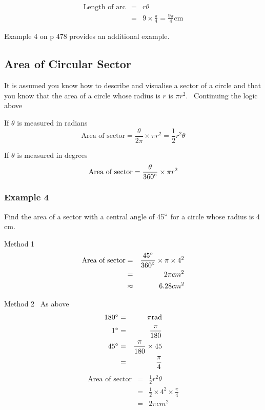 \begin{align*}\text{Length of arc} &  = & r \theta  \\
 &  = & 9 \times \frac{\pi }{4} =\frac{9 \pi }{4}\text{}\mbox{cm}\end{align*}

Example 4 on p 478 provides an additional example. 

\subsection{Area of Circular Sector}
It is assumed you know how to describe and visualise a sector of a circle and that you know that the area of a circle whose radius is $r$ is $\pi  r^{2}$. \ Continuing the logic above 

If $\theta $ is measured in radians
\begin{equation*}\text{Area of sector} =\frac{\theta }{2 \pi } \times \pi  r^{2} =\frac{1}{2} r^{2} \theta 
\end{equation*}

If $\theta $ is measured in degrees
\begin{equation*}\text{Area of sector} =\frac{\theta }{360 \mbox{{\ensuremath{{}^\circ}}}} \times \pi  r^{2}
\end{equation*}

\subsubsection{Example 4}
Find the area of a sector with a central angle of 45$\mbox{{\ensuremath{{}^\circ}}}$ for a circle whose radius is 4 $\mbox{cm}$. 

Method 1
\begin{align*}\text{Area of sector} &  = & \frac{45 \mbox{{\ensuremath{{}^\circ}}}}{360 \mbox{{\ensuremath{{}^\circ}}}} \times \pi  \times 4^{2} \\
 &  = & 2 \pi \text{}cm^{2} \\
 &  \approx  & 6.28\text{}cm^{2}\end{align*}

Method 2 \ As above
\begin{align*}180 \mbox{{\ensuremath{{}^\circ}}} &  = & \pi \text{}\mbox{rad} \\
1 \mbox{{\ensuremath{{}^\circ}}} &  = & \frac{\pi }{180} \\
45 \mbox{{\ensuremath{{}^\circ}}} &  = & \frac{\pi }{180} \times 45 \\
 &  = & \frac{\pi }{4}\end{align*}
\begin{align*}\text{Area of sector} &  = & \frac{1}{2} r^{2} \theta  \\
 &  = & \frac{1}{2} \times 4^{2} \times \frac{\pi }{4} \\
 &  = & 2 \pi \text{}cm^{2}\end{align*}

